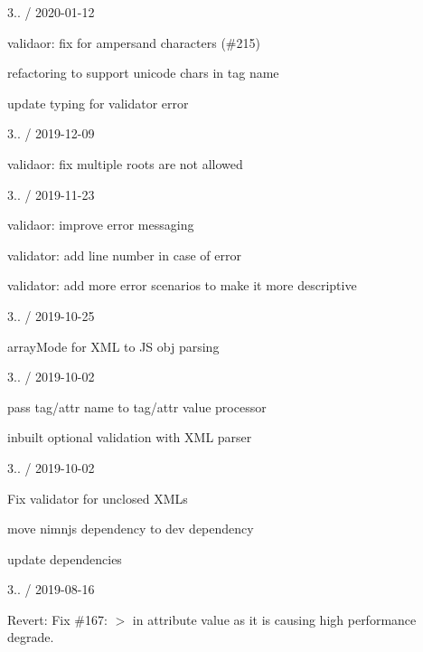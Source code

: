 3.. / 2020-\/01-\/12
\begin{DoxyItemize}
\item validaor\+: fix for ampersand characters (\#215)
\item refactoring to support unicode chars in tag name
\item update typing for validator error
\end{DoxyItemize}

3.. / 2019-\/12-\/09
\begin{DoxyItemize}
\item validaor\+: fix multiple roots are not allowed
\end{DoxyItemize}

3.. / 2019-\/11-\/23
\begin{DoxyItemize}
\item validaor\+: improve error messaging
\item validator\+: add line number in case of error
\item validator\+: add more error scenarios to make it more descriptive
\end{DoxyItemize}

3.. / 2019-\/10-\/25
\begin{DoxyItemize}
\item array\+Mode for XML to JS obj parsing
\end{DoxyItemize}

3.. / 2019-\/10-\/02
\begin{DoxyItemize}
\item pass tag/attr name to tag/attr value processor
\item inbuilt optional validation with XML parser
\end{DoxyItemize}

3.. / 2019-\/10-\/02
\begin{DoxyItemize}
\item Fix validator for unclosed XMLs
\item move nimnjs dependency to dev dependency
\item update dependencies
\end{DoxyItemize}

3.. / 2019-\/08-\/16
\begin{DoxyItemize}
\item Revert\+: Fix \#167\+: \textquotesingle{}\texorpdfstring{$>$}{>}\textquotesingle{} in attribute value as it is causing high performance degrade.
\end{DoxyItemize}

